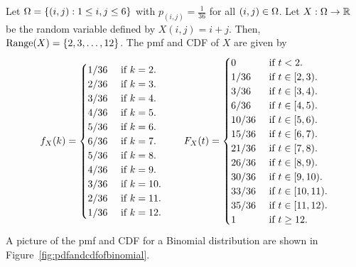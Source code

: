 \documentclass[preprint,  11pt]{amsart}
\begin{document}
\beg Let $\Omega=\{(i,j){\; : \;} 1\le i,j\le 6\}$ with $p_{(i,j)}=\frac{1}{36}$ for all $(i,j)\in \Omega$. Let $X:\Omega \rightarrow \mathbb{R}$ be the random variable defined by $X(i,j)=i+j$. Then, $\mbox{Range}(X)=\{2,3,\ldots ,12\}$. The pmf and CDF of $X$ are given by
$$
f_{X}(k) = \begin{cases}
1/36 & \mbox{ if }k=2. \\
2/36 & \mbox{ if }k=3. \\
3/36 & \mbox{ if }k=4. \\
4/36 & \mbox{ if }k=5. \\
5/36 & \mbox{ if }k=6. \\
6/36 & \mbox{ if }k=7. \\
5/36 & \mbox{ if }k=8. \\
4/36 & \mbox{ if }k=9. \\
3/36 & \mbox{ if }k=10. \\
2/36 & \mbox{ if }k=11. \\
1/36 & \mbox{ if }k=12. \\
\end{cases}
\qquad
F_{X}(t) = \begin{cases}
0 & \mbox{ if }t<2. \\
1/36 & \mbox{ if }t\in[2,3). \\
3/36 & \mbox{ if }t\in[3,4). \\
6/36 & \mbox{ if }t\in[4,5). \\
10/36 & \mbox{ if }t\in[5,6). \\
15/36 & \mbox{ if }t\in[6,7). \\
21/36 & \mbox{ if }t\in[7,8). \\
26/36 & \mbox{ if }t\in[8,9). \\
30/36 & \mbox{ if }t\in[9,10). \\
33/36 & \mbox{ if }t\in[10,11). \\
35/36 & \mbox{ if }t\in[11,12). \\
1 & \mbox{ if }t\ge 12. \\
\end{cases}
$$
\eeg
A picture of the pmf and CDF for a Binomial distribution are shown in Figure~\ref{fig:pdfandcdfofbinomial}.
\end{document}
